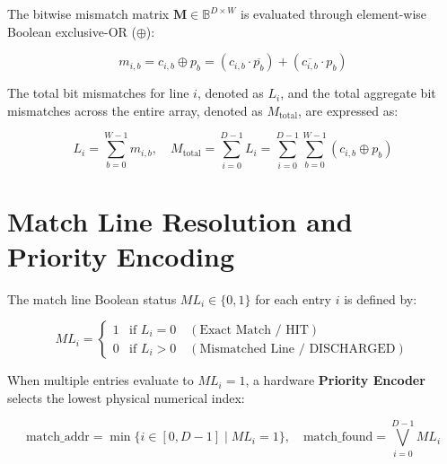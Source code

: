 \documentclass[11pt,a4paper,oneside]{report}
\begin{document}
The bitwise mismatch matrix $\mathbf{M} \in \mathbb{B}^{D \times W}$ is evaluated through element-wise Boolean exclusive-OR ($\oplus$):

\begin{equation}
m_{i,b} = c_{i,b} \oplus p_b = (c_{i,b} \cdot \overline{p_b}) + (\overline{c_{i,b}} \cdot p_b)
\end{equation}

The total bit mismatches for line $i$, denoted as $L_i$, and the total aggregate bit mismatches across the entire array, denoted as $M_{\text{total}}$, are expressed as:

\begin{equation}
L_i = \sum_{b=0}^{W-1} m_{i,b}, \quad M_{\text{total}} = \sum_{i=0}^{D-1} L_i = \sum_{i=0}^{D-1} \sum_{b=0}^{W-1} (c_{i,b} \oplus p_b)
\end{equation}

\section{Match Line Resolution and Priority Encoding}
The match line Boolean status $ML_i \in \{0, 1\}$ for each entry $i$ is defined by:

\begin{equation}
ML_i = \begin{cases}
1 & \text{if } L_i = 0 \quad (\text{Exact Match / HIT}) \\
0 & \text{if } L_i > 0 \quad (\text{Mismatched Line / DISCHARGED})
\end{cases}
\end{equation}

When multiple entries evaluate to $ML_i = 1$, a hardware \textbf{Priority Encoder} selects the lowest physical numerical index:

\begin{equation}
\text{match\_addr} = \min \{ i \in [0, D-1] \mid ML_i = 1 \}, \quad \text{match\_found} = \bigvee_{i=0}^{D-1} ML_i
\end{equation}
\end{document}
